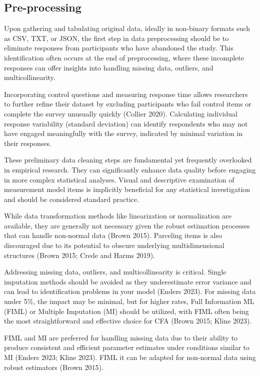 \documentclass[
  a4paper,
]{article}
\begin{document}
\subsection{Pre-processing}\label{pre-processing}

Upon gathering and tabulating original data, ideally in non-binary
formats such as CSV, TXT, or JSON, the first step in data preprocessing
should be to eliminate responses from participants who have abandoned
the study. This identification often occurs at the end of preprocessing,
where these incomplete responses can offer insights into handling
missing data, outliers, and multicollinearity.

Incorporating control questions and measuring response time allows
researchers to further refine their dataset by excluding participants
who fail control items or complete the survey unusually quickly (Collier
2020). Calculating individual response variability (standard deviation)
can identify respondents who may not have engaged meaningfully with the
survey, indicated by minimal variation in their responses.

These preliminary data cleaning steps are fundamental yet frequently
overlooked in empirical research. They can significantly enhance data
quality before engaging in more complex statistical analyses. Visual and
descriptive examination of measurement model items is implicitly
beneficial for any statistical investigation and should be considered
standard practice.

While data transformation methods like linearization or normalization
are available, they are generally not necessary given the robust
estimation processes that can handle non-normal data (Brown 2015).
Parceling items is also discouraged due to its potential to obscure
underlying multidimensional structures (Brown 2015; Crede and Harms
2019).

Addressing missing data, outliers, and multicollinearity is critical.
Single imputation methods should be avoided as they underestimate error
variance and can lead to identification problems in your model (Enders
2023). For missing data under 5\%, the impact may be minimal, but for
higher rates, Full Information ML (FIML) or Multiple Imputation (MI)
should be utilized, with FIML often being the most straightforward and
effective choice for CFA (Brown 2015; Kline 2023).

FIML and MI are preferred for handling missing data due to their ability
to produce consistent and efficient parameter estimates under conditions
similar to MI (Enders 2023; Kline 2023). FIML it can be adapted for
non-normal data using robust estimators (Brown 2015).
\end{document}
